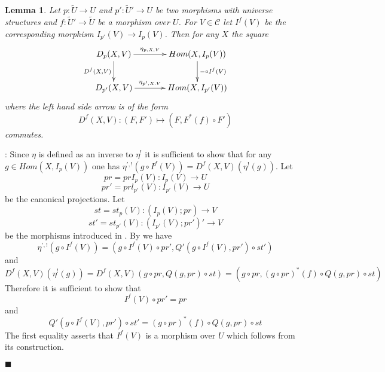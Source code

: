 \documentclass[12pt]{article}
\numberwithin{equation}{section}
\newenvironment{myproof}{{\bf Proof}:}{$\blacksquare$ \vskip 5mm }
\newtheorem{lemma}[proposition]{Lemma}
\newcommand{\llabel}[1]{\label{#1}}
\newcommand{\sr}{\rightarrow}
\newcommand{\wt}{\widetilde}
\begin{document}
%
%
\begin{lemma}
\llabel{2015.04.02.l4} Let $p:\wt{U}\sr U$ and $p':\wt{U}'\sr U$ be two
morphisms with universe structures and $f:\wt{U}'\sr \wt{U}$ be a morphism over
$U$. For $V\in {\mathcal C}$ let $I^f(V)$ be the corresponding morphism
$I_{p'}(V)\sr I_p(V)$. Then for any $X$ the square
%
$$
\begin{xy}
          \xymatrix@C=3pc{ D_p(X,V) \ar[r]^-{\eta_{p,X,V}} \ar[d]_{D^f(X,V)} &
            Hom(X, I_p(V)) \ar[d]^{-\circ I^f(V)}\\ D_{p'}(X,V)
            \ar[r]^-{\eta_{p',X.V}} & Hom (X, I_{p'}(V)) }
\end{xy}
$$
%
where the left hand side arrow is of the form
%
$$D^f(X,V):(F, F')\mapsto (F,F^*(f)\circ F')$$
%
commutes.
\end{lemma}
%
\begin{myproof}
Since $\eta$ is defined as an inverse to $\eta^!$ it is sufficient to show that
for any $g\in Hom(X,I_p(V))$ one has $\eta^{',!}(g\circ
I^f(V))=D^f(X,V)(\eta^!(g))$. Let
%
$$pr=prI_p(V):I_p(V)\sr U$$
$$pr'=prl_{p'}(V):I_{p'}(V)\sr U$$
%
be the canonical projections. Let
%
$$st=st_p(V):(I_p(V);pr)\sr V$$
$$st'=st_{p'}(V):(I_{p'}(V);pr')'\sr V$$
%
be the morphisms introduced in \cite{fromunivwithPi}. By \cite[Problem
  3.8]{fromunivwithPi} we have
%
$$\eta^{',!}(g\circ I^f(V))=(g\circ I^f(V)\circ pr', Q'(g\circ I^f(V),
pr')\circ st')$$
%
and
%
$$D^f(X,V)(\eta^!(g))=D^f(X,V)(g\circ pr, Q(g,pr)\circ st)=(g\circ pr, (g\circ
pr)^*(f)\circ Q(g,pr)\circ st)$$
%
Therefore it is sufficient to show that
%
$$I^f(V)\circ pr'=pr$$
%
and
%
$$Q'(g\circ I^f(V), pr')\circ st'=(g\circ pr)^*(f)\circ Q(g,pr)\circ st$$
%
The first equality asserts that $I^f(V)$ is a morphism over $U$ which follows
from its construction.


\end{myproof}
\end{document}
